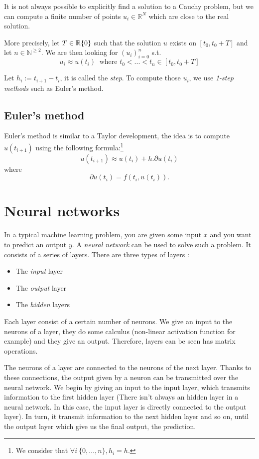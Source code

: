 \documentclass[10pt,a4paper]{article}
\theoremstyle{definition}
\theoremstyle{definition}
\begin{document}
It is not always possible to explicitly find a solution to a Cauchy problem, but we can compute a finite number of points $u_i \in \mathbb{R}^N$ which are close to the real solution. 

More precisely, let $T \in \mathbb{R}\\\{0\}$ such that the solution $u$ exists on $[t_0, t_0 + T]$ and let $n \in \mathbb{N}^{\geqslant 2}$. We are then looking for $(u_i)^n_{i=0}$ s.t. 
\[
u_i \approx u(t_i) \ \text{ where } t_0 < ... < t_n \in [t_0, t_0 + T]
\]

Let $h_i := t_{i+1} - t_i$, it is called the \textit{step}. To compute those $u_i$, we use \textit{1-step methods} such as Euler's method.

\subsection{Euler's method}

Euler's method is similar to a Taylor development, the idea is to compute $u(t_{i+1})$ using the following formula:\footnote{We consider that $ \forall i\ \{0,...,n\}, h_i = h$.}
\[
u(t_{i+1}) \approx u(t_i) + h . \partial u(t_i)
\]
where 
\[
\partial u(t_i) = f(t_i, u(t_i)).
\]

\section{Neural networks}

In a typical machine learning problem, you are given some input $x$ and you want to predict an output $y$. A \textit{neural network} can be used to solve such a problem. It consists of a series of layers. There are three types of layers :

\begin{itemize}
\item The \textit{input} layer
\item The \textit{output} layer
\item The \textit{hidden} layers
\end{itemize}

Each layer consist of a certain number of neurons. We give an input to the neurons of a layer, they do some calculus (non-linear activation function for example) and they give an output. Therefore, layers can be seen has matrix operations. 

The neurons of a layer are connected to the neurons of the next layer. Thanks to these connections, the output given by a neuron can be transmitted over the neural network. We begin by giving an input to the input layer, which transmits information to the first hidden layer (There isn't always an hidden layer in a neural network. In this case, the input layer is directly connected to the output layer). In turn, it transmit information to the next hidden layer and so on, until the output layer which give us the final output, the prediction. 
\end{document}
